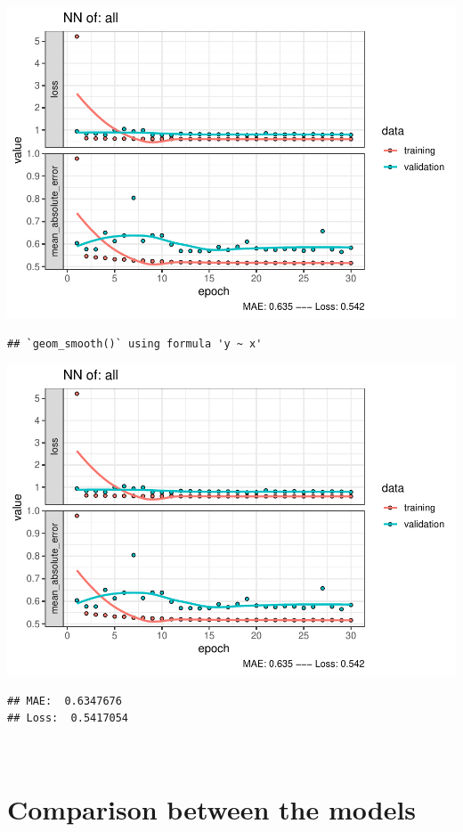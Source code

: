 \documentclass[
]{article}
\begin{document}
\includegraphics{project-code_files/figure-latex/unnamed-chunk-18-41.pdf}

\begin{verbatim}
## `geom_smooth()` using formula 'y ~ x'
\end{verbatim}

\includegraphics{project-code_files/figure-latex/unnamed-chunk-18-42.pdf}

\begin{verbatim}
## MAE:  0.6347676
## Loss:  0.5417054
\end{verbatim}

~\\

\hypertarget{comparison-between-the-models}{%
\section{Comparison between the
models}\label{comparison-between-the-models}}
\end{document}
